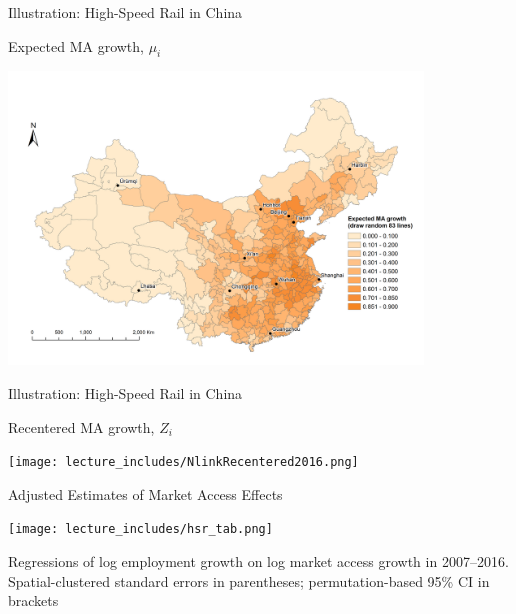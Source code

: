 \documentclass{beamer}
\begin{document}
\begin{frame}[t]{Illustration: High-Speed Rail in China} 
\vspace{-0.3cm}
	\begin{center}
		Expected MA growth, $\mu_i$

		\includegraphics[trim={1cm 0.5cm 0.5cm 1cm},clip,width=11cm]{lecture_includes/DateExpected2016.png}
	\end{center}
\end{frame}

\begin{frame}{Illustration: High-Speed Rail in China}
	\begin{center}
Recentered MA growth, $Z_i$

	\texttt{[image: lecture\_includes/NlinkRecentered2016.png]}
	\end{center}
\end{frame}

\begin{frame}[label=HSRTable]{Adjusted Estimates of Market Access Effects}
	\begin{center}
	\texttt{[image: lecture\_includes/hsr\_tab.png]}
	
	\footnotesize{Regressions of log employment growth on log market access growth in 2007--2016. Spatial-clustered standard errors in parentheses; permutation-based 95\% CI in brackets}
	\end{center}
\end{frame}
\end{document}
